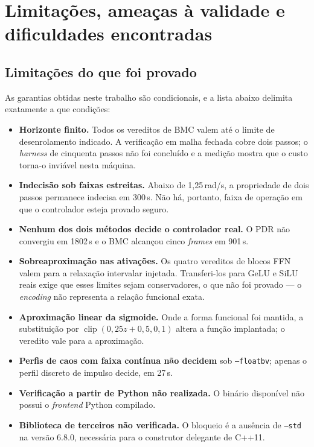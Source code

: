 \section{Limitações, ameaças à validade e dificuldades encontradas}
\label{sec:limitacoes}

\subsection{Limitações do que foi provado}

As garantias obtidas neste trabalho são condicionais, e a lista abaixo delimita exatamente a
que condições:

\begin{itemize}[leftmargin=1.4cm]
  \item \textbf{Horizonte finito.} Todos os vereditos de BMC valem até o limite de
  desenrolamento indicado. A verificação em malha fechada cobre dois passos; o
  \textit{harness} de cinquenta passos não foi concluído e a medição mostra que o custo
  torna-o inviável nesta máquina.
  \item \textbf{Indecisão sob faixas estreitas.} Abaixo de 1,25\,rad/s, a propriedade de dois
  passos permanece indecisa em 300\,s. Não há, portanto, faixa de operação em que o
  controlador esteja provado seguro.
  \item \textbf{Nenhum dos dois métodos decide o controlador real.} O PDR não convergiu em
  1802\,s e o BMC alcançou cinco \textit{frames} em 901\,s.
  \item \textbf{Sobreaproximação nas ativações.} Os quatro vereditos de blocos FFN valem para
  a relaxação intervalar injetada. Transferi-los para GeLU e SiLU reais exige que esses
  limites sejam conservadores, o que não foi provado --- o \textit{encoding} não representa a
  relação funcional exata.
  \item \textbf{Aproximação linear da sigmoide.} Onde a forma funcional foi mantida, a
  substituição por $\operatorname{clip}(0{,}25z + 0{,}5, 0, 1)$ altera a função implantada; o
  veredito vale para a aproximação.
  \item \textbf{Perfis de caos com faixa contínua não decidem} sob \texttt{--floatbv}; apenas
  o perfil discreto de impulso decide, em 27\,s.
  \item \textbf{Verificação a partir de Python não realizada.} O binário disponível não possui
  o \textit{frontend} Python compilado.
  \item \textbf{Biblioteca de terceiros não verificada.} O bloqueio é a ausência de
  \texttt{--std} na versão 6.8.0, necessária para o construtor delegante de C++11.
\end{itemize}

